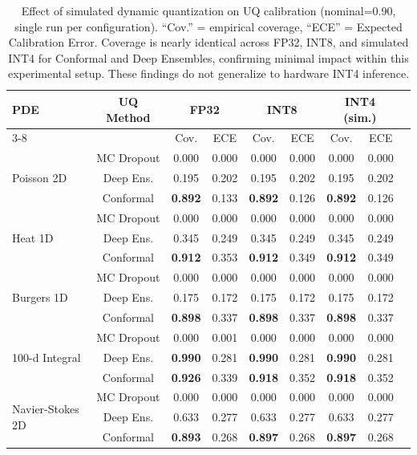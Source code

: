 \documentclass[12pt,a4paper]{article}
\theoremstyle{plain}
\begin{document}
\begin{table}[ht]
    \centering
    \caption{Effect of simulated dynamic quantization on UQ calibration
        (nominal=0.90, single run per configuration).
        ``Cov.'' = empirical coverage, ``ECE'' = Expected Calibration Error.
        Coverage is nearly identical across FP32, INT8, and simulated INT4
        for Conformal and Deep Ensembles, confirming minimal impact within
        this experimental setup.  These findings do not generalize to
    hardware INT4 inference.}
    \begin{tabular}{lcccccccc}
        \toprule
        \textbf{PDE} & \textbf{UQ Method} &
        \multicolumn{2}{c}{\textbf{FP32}} &
        \multicolumn{2}{c}{\textbf{INT8}} &
        \multicolumn{2}{c}{\textbf{INT4 (sim.)}} \\
        \cmidrule{3-8}
        & & Cov. & ECE & Cov. & ECE & Cov. & ECE \\
        \midrule
        \multirow{3}{*}{Poisson 2D}
        & MC Dropout & 0.000 & 0.000 & 0.000 & 0.000 & 0.000 & 0.000 \\
        & Deep Ens.  & 0.195 & 0.202 & 0.195 & 0.202 & 0.195 & 0.202 \\
        & Conformal & \textbf{0.892} & 0.133 & \textbf{0.892} & 0.126 & \textbf{0.892} & 0.126 \\
        \midrule
        \multirow{3}{*}{Heat 1D}
        & MC Dropout & 0.000 & 0.000 & 0.000 & 0.000 & 0.000 & 0.000 \\
        & Deep Ens.  & 0.345 & 0.249 & 0.345 & 0.249 & 0.345 & 0.249 \\
        & Conformal & \textbf{0.912} & 0.353 & \textbf{0.912} & 0.349 & \textbf{0.912} & 0.349 \\
        \midrule
        \multirow{3}{*}{Burgers 1D}
        & MC Dropout & 0.000 & 0.000 & 0.000 & 0.000 & 0.000 & 0.000 \\
        & Deep Ens.  & 0.175 & 0.172 & 0.175 & 0.172 & 0.175 & 0.172 \\
        & Conformal & \textbf{0.898} & 0.337 & \textbf{0.898} & 0.337 & \textbf{0.898} & 0.337 \\
        \midrule
        \multirow{3}{*}{100-d Integral}
        & MC Dropout & 0.000 & 0.001 & 0.000 & 0.000 & 0.000 & 0.000 \\
        & Deep Ens.  & \textbf{0.990} & 0.281 & \textbf{0.990} & 0.281 & \textbf{0.990} & 0.281 \\
        & Conformal & \textbf{0.926} & 0.339 & \textbf{0.918} & 0.352 & \textbf{0.918} & 0.352 \\
        \midrule
        \multirow{3}{*}{Navier-Stokes 2D}
        & MC Dropout & 0.000 & 0.000 & 0.000 & 0.000 & 0.000 & 0.000 \\
        & Deep Ens.  & 0.633 & 0.277 & 0.633 & 0.277 & 0.633 & 0.277 \\
        & Conformal & \textbf{0.893} & 0.268 & \textbf{0.897} & 0.268 & \textbf{0.897} & 0.268 \\
        \bottomrule
    \end{tabular}
    \label{tab:quantization}
\end{table}
\end{document}
